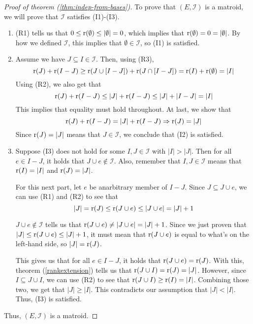 \begin{proof}[Proof of theorem (\ref{thm:indep-from-bases})]
To prove that $(E,\mathcal{I})$ is a matroid, we will prove that $\mathcal{I}$ satisfies (I1)-(I3).
    \begin{enumerate}
        \item (R1) tells us that $0\leq\operatorname{r}(\emptyset)\leq|\emptyset|=0$, which implies that $\operatorname{r}(\emptyset)=0=|\emptyset|$. By how we defined $\mathcal{I}$, this implies that $\emptyset\in\mathcal{I}$, so (I1) is satisfied.
        \item Assume we have $J\subseteq I\in\mathcal{I}$. Then, using (R3),
        $$ \operatorname{r}(J)+\operatorname{r}(I-J) \geq \operatorname{r}(J\cup[I-J])+\operatorname{r}(J\cap[I-J]) = \operatorname{r}(I)+\operatorname{r}(\emptyset)=|I| $$
        Using (R2), we also get that
        $$ \operatorname{r}(J)+\operatorname{r}(I-J) \leq |J|+\operatorname{r}(I-J) \leq |J|+|I-J| = |I| $$
        This implies that equality must hold throughout. At last, we show that
        $$ \operatorname{r}(J)+\operatorname{r}(I-J) = |J|+\operatorname{r}(I-J) \Rightarrow \operatorname{r}(J)=|J| $$
        Since $\operatorname{r}(J)=|J|$ means that $J\in\mathcal{I}$, we conclude that (I2) is satisfied.
        
        \item Suppose (I3) does not hold for some $I,J\in\mathcal{I}$ with $|I|>|J|$. Then for all $e\in I-J$, it holds that $J\cup e\notin \mathcal{I}$. Also, remember that $I,J\in\mathcal{I}$ means that $\operatorname{r}(I)=|I|$ and $\operatorname{r}(J)=|J|$.

        For this next part, let $e$ be anarbitrary member of $I-J$. Since $J\subseteq J\cup e$, we can use (R1) and (R2) to see that
        $$ |J|=\operatorname{r}(J)\leq\operatorname{r}(J\cup e)\leq|J\cup e|=|J|+1 $$
        
        $J\cup e\notin \mathcal{I}$ tells us that $\operatorname{r}(J\cup e)\neq|J\cup e|=|J|+1$. Since we just proven that $|J|\leq\operatorname{r}(J\cup e)\leq|J|+1$, it must mean that $\operatorname{r}(J\cup e)$ is equal to what's on the left-hand side, so $|J|=\operatorname{r}(J)$.

        This gives us that for all $e\in I-J$, it holds that $\operatorname{r}(J\cup e)=\operatorname{r}(J)$. With this, theorem (\ref{rankextension}) tells us that $\operatorname{r}(J\cup I)=\operatorname{r}(J)=|J|$. However, since $I\subseteq J\cup I$, we can use (R2) to see that $\operatorname{r}(J\cup I) \geq \operatorname{r}(I) = |I|$. Combining those two, we get that $|J|\geq|I|$. This contradicts our assumption that $|J|<|I|$. Thus, (I3) is satisfied.
    \end{enumerate}
    Thus, $(E,\mathcal{I})$ is a matroid.
\end{proof}



